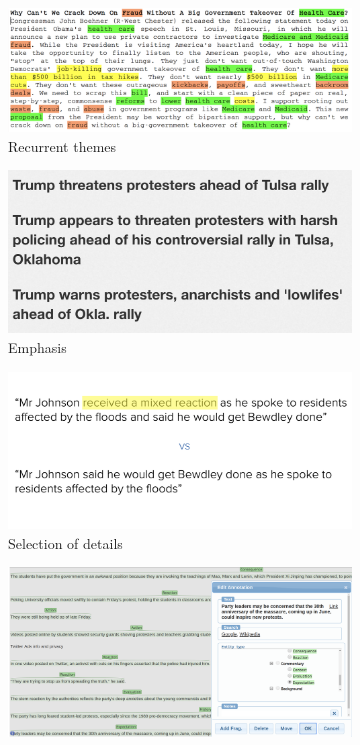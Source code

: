 \begin{figure}[!htb]
\begin{subfigure}{.5\textwidth}
  \centering
  \includegraphics[width=.95\linewidth]{figures/themes.png}
  \caption{Recurrent themes}
  \label{fig:sfig1}
\end{subfigure}%
\begin{subfigure}{.5\textwidth}
  \centering
  \includegraphics[width=.95\linewidth]{figures/emphasis.png}
  \caption{Emphasis}
  \label{fig:sfig2}
\end{subfigure}
\begin{subfigure}{.5\textwidth}
  \centering
  \includegraphics[width=.95\linewidth]{figures/selection_details.png}
  \caption{Selection of details}
  \label{fig:sfig1}
\end{subfigure}%
\begin{subfigure}{.5\textwidth}
  \centering
  \includegraphics[width=.95\linewidth]{figures/prepackaging.png}

\end{subfigure}
\end{figure}

